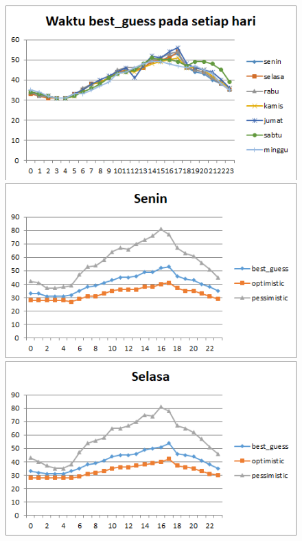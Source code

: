 \begin{figure}[H]
				\centering		
				\includegraphics[]{Gambar/waktubestguesssampel117072017normal.png}
				\includegraphics[]{Gambar/seninsampel117072017normal.png}
				\includegraphics[]{Gambar/selasasampel117072017normal.png}
\end{figure}			
			
